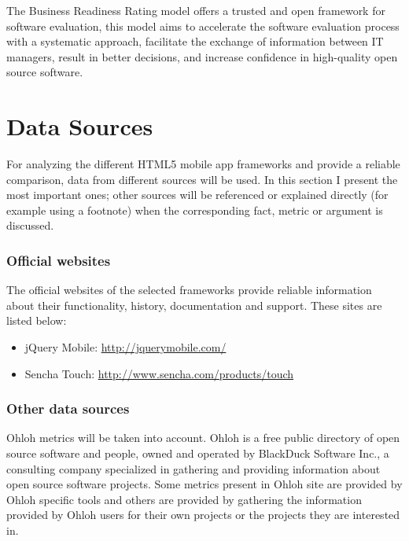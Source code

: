 \documentclass[a4paper,12pt]{book}
\begin{document}
The Business Readiness Rating model offers a trusted and open framework for
software evaluation, this model aims to accelerate the software evaluation
process with a systematic approach, facilitate the exchange of information
between IT managers, result in better decisions, and increase confidence in
high-quality open source software.

\section{Data Sources}
\label{sec:data}

For analyzing the different HTML5 mobile app frameworks and
provide a reliable comparison, data from different sources will be used. In
this section I present the most important ones; other sources will be
referenced or explained directly (for example using a footnote) when the
corresponding fact, metric or argument is discussed.

\subsubsection{Official websites}
The official websites of the selected frameworks provide reliable information about their functionality, history, documentation and support. These sites are listed below:
\begin{itemize}
 \item jQuery Mobile: \url{http://jquerymobile.com/}
 \item Sencha Touch: \url{http://www.sencha.com/products/touch}
\end{itemize}

\subsubsection{Other data sources}
Ohloh metrics will be taken into account. Ohloh\cite{Ohloh} is a free public
directory of open source software and people, owned and operated by BlackDuck
Software Inc., a consulting company specialized in gathering and providing
information about open source software projects. Some metrics present in Ohloh
site are provided by Ohloh specific tools and others are provided by gathering
the information provided by Ohloh users for their own projects or the projects
they are interested in.


\end{document}
